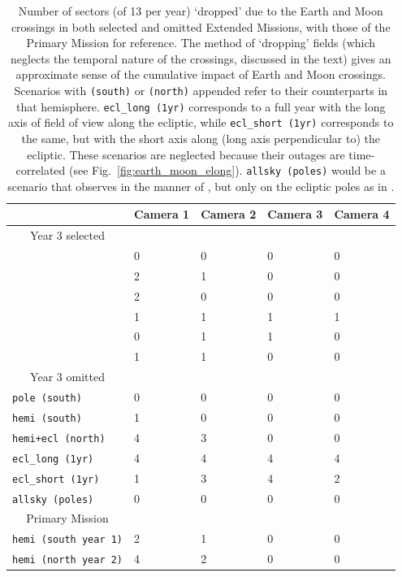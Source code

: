 \begin{table}[!tb]
	\centering
	\begin{tabular}{ | l | l | l | l | l | }
		\hline
		\ & Camera 1 & Camera 2 & Camera 3 & Camera 4 \\ \hline
		\multicolumn{1}{|c|}{Year 3 selected} & \  & \  & \  & \  \\ \hline
		\npole & 0 & 0 & 0 & 0 \\ \hline
		\nhemi & 2 & 1 & 0 & 0 \\ \hline
		\shemiAvoid & 2 & 0 & 0 & 0 \\ \hline
		\elong & 1 & 1 & 1 & 1 \\ \hline
		\eshort & 0 & 1 & 1 & 0 \\ \hline
		\hemis & 1 & 1 & 0 & 0 \\ \hline
		\multicolumn{1}{|c|}{Year 3 omitted} & \  & \  & \  & \  \\ \hline
		\texttt{pole\,(south)}  & 0 & 0 & 0 & 0 \\ \hline
		\texttt{hemi\,(south)} & 1 & 0 & 0 & 0 \\ \hline
		\texttt{hemi+ecl\,(north)} & 4 & 3 & 0 & 0 \\ \hline
		\texttt{ecl\_long\,(1yr)} & 4 & 4 & 4 & 4 \\ \hline
		\texttt{ecl\_short\,(1yr)} & 1 & 3 & 4 & 2 \\ \hline
		\texttt{allsky\,(poles)} & 0 & 0 & 0 & 0 \\ \hline
		\multicolumn{1}{|c|}{Primary Mission} & \  & \  & \  & \  \\ \hline
		\texttt{hemi\,(south year 1)} & 2 & 1 & 0 & 0 \\ \hline
		\texttt{hemi\,(north year 2)} & 4 & 2 & 0 & 0 \\ \hline
	\end{tabular}
	\caption{Number of sectors (of 13 per year) `dropped' due to the Earth and 
	Moon crossings in both selected and omitted Extended Missions, with those 
	of the Primary Mission for reference. The method of `dropping' fields 
	(which neglects the temporal nature of the crossings, discussed in the 
	text) gives an approximate sense of the cumulative impact of Earth and Moon 
	crossings. 
  Scenarios with \texttt{(south)} or \texttt{(north)} appended refer to their
  counterparts in that hemisphere.
		\texttt{ecl\_long\,(1yr)} corresponds to a full year with the long axis 
		of \tesss field of view along the ecliptic, while 
		\texttt{ecl\_short\,(1yr)} corresponds to the same, but with the short 
		axis along (long axis perpendicular to) the ecliptic. These scenarios 
		are neglected because their outages are time-correlated (see 
		Fig.~\protect\ref{fig:earth_moon_elong}).
		\texttt{allsky\,(poles)} would be a scenario that observes in the manner of \hemis, but only on the ecliptic poles as in \npole.}
	\label{tab:dropped_fields}
\end{table}


